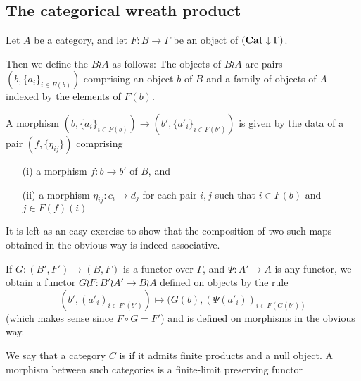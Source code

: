 \subsection{The categorical wreath product}

Let \(A\) be a category, and let \(F\colon B\to \Gamma\) be an object of \({({\operatorname{\mathbf{Cat}}}\downarrow \Gamma)}\).  

Then we define the  \(B\wr A\) as follows: The objects of \(B\wr A\) are pairs \((b, \{a_i\}_{i\in F(b)})\) comprising an object \(b\) of \(B\) and a family of objects of \(A\) indexed by the elements of \(F(b)\).  

A morphism \((b, \{a_i\}_{i\in F(b)})\to (b', \{a'_i\}_{i\in F(b')})\) is given by the data of a pair \((f, \{\eta_{ij}\})\) comprising
\begin{enumerate}
\item [(i)] a morphism \(f \colon b\to b'\) of \(B\), and
\item [(ii)] a morphism \(\eta_{ij}:c_i\to d_j\) for each pair \(i,j\) such that \(i\in F(b)\) and \(j\in F(f)(i)\)
\end{enumerate}

It is left as an easy exercise to show that the composition of two such maps obtained in the obvious way is indeed associative.

If \(G\colon (B',F')\to (B,F)\) is a functor over \(\Gamma\), and \(\Psi\colon A'\to A\) is any functor, we obtain a functor \(G\wr F\colon B' \wr A'\to B\wr A\) defined on objects by the rule \[(b',(a'_i)_{i\in F'(b')})\mapsto (G(b),(\Psi(a'_i))_{i\in F(G(b'))}\] (which makes sense since \(F\circ G=F'\)) and is defined on morphisms in the obvious way. 

\begin{defn} We say that a category \(C\) is  if it admits finite products and a null object.  A morphism between such categories is a finite-limit preserving functor
\end{defn}

